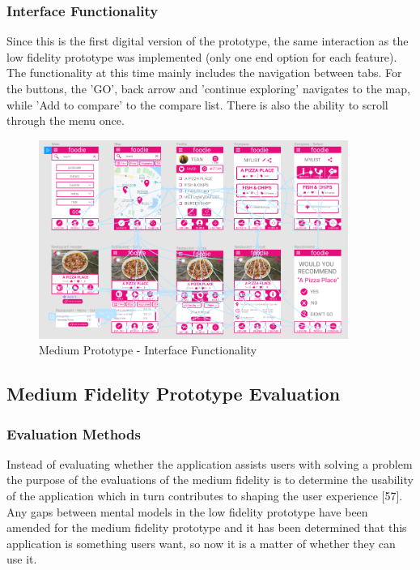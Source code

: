 \documentclass[a4 paper, 12pt]{article}
\begin{document}
        \subsubsection{Interface Functionality}
        Since this is the first digital version of the prototype, the same interaction as the low fidelity prototype was implemented (only one end option for each feature). The functionality at this time mainly includes the navigation between tabs. For the buttons, the 'GO', back arrow and 'continue exploring' navigates to the map, while 'Add to compare' to the compare list. There is also the ability to scroll through the menu once. 
        \begin{figure} [H]
            \centering
            \includegraphics[width=0.9\textwidth, frame]
                {./Med_Fidelity/Med_Report/images/med_proto_func.PNG}  
            \caption{Medium Prototype - Interface Functionality}
        \end{figure}


\subsection{Medium Fidelity Prototype Evaluation}

    \subsubsection{Evaluation Methods}
    Instead of evaluating whether the application assists users with solving a problem the purpose of the evaluations of the medium fidelity is to determine the usability of the application which in turn contributes to shaping the user experience [57]. Any gaps between mental models in the low fidelity prototype have been amended for the medium fidelity prototype and it has been determined that this application is something users want, so now it is a matter of whether they can use it.  
\end{document}
